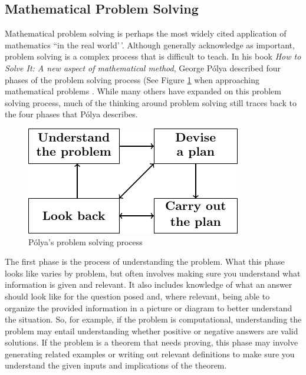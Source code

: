 \documentclass[
]{book}
\theoremstyle{definition}
\theoremstyle{definition}
\theoremstyle{definition}
\theoremstyle{definition}
\theoremstyle{remark}
\begin{document}
\hypertarget{mathematical-problem-solving}{%
\subsection{Mathematical Problem Solving}\label{mathematical-problem-solving}}

Mathematical problem solving is perhaps the most widely cited application of mathematics ``in the real world'\,'. Although generally acknowledge as important, problem solving is a complex process that is difficult to teach. In his book \emph{How to Solve It: A new aspect of mathematical method}, George Pólya described four phases of the problem solving process (See Figure \ref{fig:polya} when approaching mathematical problems \citep{Polya1945}. While many others have expanded on this problem solving process, much of the thinking around problem solving still traces back to the four phases that Pólya describes.

\begin{figure}

{\centering \includegraphics[width=0.45\linewidth]{tikz/polya} 

}

\caption{Pólya's problem solving process}\label{fig:polya}
\end{figure}

The first phase is the process of understanding the problem. What this phase looks like varies by problem, but often involves making sure you understand what information is given and relevant. It also includes knowledge of what an answer should look like for the question posed and, where relevant, being able to organize the provided information in a picture or diagram to better understand the situation. So, for example, if the problem is computational, understanding the problem may entail understanding whether positive or negative answers are valid solutions. If the problem is a theorem that needs proving, this phase may involve generating related examples or writing out relevant definitions to make sure you understand the given inputs and implications of the theorem.
\end{document}

